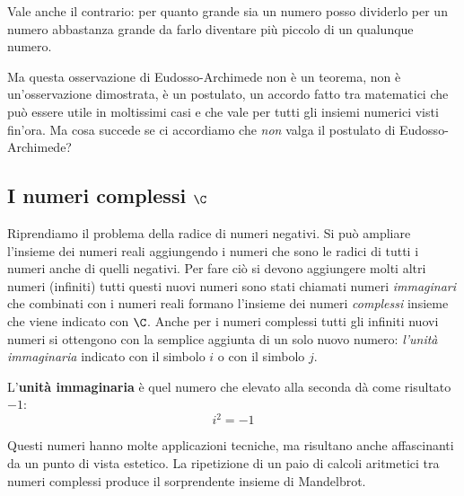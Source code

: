 Vale anche il contrario: per quanto grande sia un numero posso dividerlo 
per un numero abbastanza grande da farlo diventare più piccolo di un 
qualunque numero.

Ma questa osservazione di Eudosso-Archimede non è un teorema, non è 
un'osservazione dimostrata, è un postulato, un accordo fatto tra matematici 
che può essere utile in moltissimi casi e che vale per tutti gli insiemi 
numerici visti fin'ora. 
Ma cosa succede se ci accordiamo che \emph{non} valga il postulato di 
Eudosso-Archimede?

\subsection{I numeri complessi $\C$}
\label{subsec:insnum_complessi}

Riprendiamo il problema della radice di numeri negativi. Si può ampliare 
l'insieme dei numeri reali aggiungendo i numeri che sono le 
radici di tutti i numeri anche di quelli negativi. Per fare ciò si devono 
aggiungere molti altri numeri (infiniti) tutti questi nuovi numeri sono 
stati chiamati numeri \emph{immaginari} che combinati con i numeri reali 
formano l'insieme dei numeri \emph{complessi} insieme che viene indicato 
con 
$\C$. 
Anche per i numeri complessi tutti gli infiniti nuovi numeri si ottengono 
con la semplice aggiunta di un solo nuovo numero: \emph{l'unità 
immaginaria} indicato con il simbolo \(i\) o con il simbolo \(j\).
\begin{definizione}
 L'\textbf{unità immaginaria} è quel numero che elevato alla seconda dà 
come risultato \(-1\):
\[i^2 = -1\]
\end{definizione}

Questi numeri hanno molte applicazioni tecniche, ma risultano anche 
affascinanti da un punto di vista estetico. La ripetizione di un paio di 
calcoli aritmetici tra numeri complessi produce il sorprendente insieme di 
Mandelbrot.

